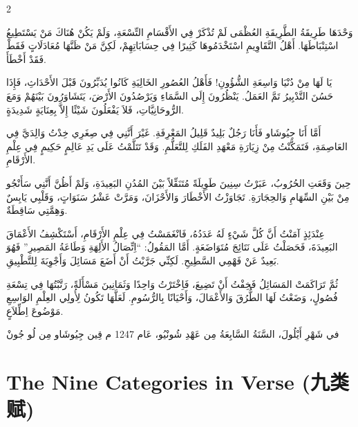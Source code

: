 \documentclass[11pt,a4paper]{article}
\newcommand{\ar}[1]{\arabicfont\beginR #1\endR}
\providecommand{\enquote}[1]{``#1''}
\newcommand{\zhtext}[1]{{\chinese #1}}
\newenvironment{bilingual}{%
  \begin{paracol}{2}
}{%
  \end{paracol}
}
\begin{document}
\begin{bilingual}
\begin{rightcolumn*}
\ar{وَحْدَهَا طَرِيقَةُ الطَّرِيقَةِ العُظْمَى لَمْ تُذْكَرْ فِي الأَقْسَامِ التِّسْعَةِ، وَلَمْ يَكُنْ هُنَاكَ مَنْ يَسْتَطِيعُ اسْتِنْبَاطَهَا. أَهْلُ التَّقَاوِيمِ اسْتَخْدَمُوهَا كَثِيرًا فِي حِسَابَاتِهِمْ، لَكِنَّ مَنْ ظَنَّهَا مُعَادَلَاتٍ فَقَطْ فَقَدْ أَخْطَأَ.}

\ar{يَا لَهَا مِنْ دُنْيَا وَاسِعَةِ الشُّؤُونِ! فَأَهْلُ العُصُورِ الخَالِيَةِ كَانُوا يُدَبِّرُونَ قَبْلَ الأَحْدَاثِ، فَإِذَا حَسُنَ التَّدْبِيرُ تَمَّ العَمَلُ. يَنْظُرُونَ إِلَى السَّمَاءِ وَيَرْصُدُونَ الأَرْضَ، يَتَشَاوَرُونَ بَيْنَهُمْ وَمَعَ الرُّوحَانِيَّاتِ، فَلاَ يَفْعَلُونَ شَيْئًا إِلاَّ بِعِنَايَةٍ شَدِيدَةٍ.}

\ar{أَمَّا أَنَا جِيُوشَاو فَأَنَا رَجُلٌ بَلِيدٌ قَلِيلُ المَعْرِفَةِ. غَيْرَ أَنَّنِي فِي صِغَرِي خِدْتُ وَالِدَيَّ فِي العَاصِمَةِ، فَتَمَكَّنْتُ مِنْ زِيَارَةِ مَعْهَدِ الفَلَكِ لِلتَّعَلُّمِ. وَقَدْ تَتَلَّمْتُ عَلَى يَدِ عَالِمٍ حَكِيمٍ فِي عِلْمِ الأَرْقَامِ.}

\ar{حِينَ وَقَعَتِ الحُرُوبُ، عَبَرْتُ سِنِينَ طَوِيلَةً مُتَنَقِّلاً بَيْنَ المُدُنِ البَعِيدَةِ، وَلَمْ أَظُنَّ أَنَّنِي سَأَنْجُو مِنْ بَيْنِ السِّهَامِ وَالحِجَارَةِ. تَجَاوَزْتُ الأَخْطَارَ وَالأَحْزَانَ، وَمَرَّتْ عَشْرُ سَنَوَاتٍ، وَقَلْبِي يَابِسٌ وَهِمَّتِي سَاقِطَةٌ.}

\ar{عِنْدَئِذٍ آمَنْتُ أَنَّ كُلَّ شَيْءٍ لَهُ عَدَدُهُ، فَانْغَمَسْتُ فِي عِلْمِ الأَرْقَامِ، أَسْتَكْشِفُ الأَعْمَاقَ البَعِيدَةَ، فَحَصَلْتُ عَلَى نَتَائِجَ مُتَوَاضَعَةٍ. أَمَّا المَقُولُ: \enquote{اِتِّصَالُ الأَلِهَةِ وَطَاعَةُ المَصِيرِ} فَهُوَ بَعِيدٌ عَنْ فَهْمِي السَّطِيحِ. لَكِنِّي جَرَّبْتُ أَنْ أَضَعَ مَسَائِلَ وَأَجْوِبَةَ لِلتَّطْبِيقِ.}

\ar{ثُمَّ تَرَاكَمَتْ المَسَائِلُ فَخِفْتُ أَنْ تَضِيعَ، فَاِخْتَرْتُ وَاحِدًا وَثَمَانِينَ مَسْأَلَةً، رَتَّبْتُهَا فِي تِسْعَةِ فُصُولٍ، وَضَعْتُ لَهَا الطُّرُقَ وَالأَعْمَالَ، وَأَحْيَانًا بِالرُّسُومِ. لَعَلَّهَا تَكُونُ لِأُولِي العِلْمِ الوَاسِعِ مَوْضُوعَ اِطِّلاَعٍ.}

\vfill
\ar{\hfill في شَهْرِ أَيْلُولَ، السَّنَةُ السَّابِعَةُ مِن عَهْدِ شُونْيُو، عَام 1247 م}
\ar{\hfill قِين جِيُوشَاو مِن لُو جُونْ}
\end{rightcolumn*}

\end{bilingual}

\newpage

\section{The Nine Categories in Verse (\zhtext{九类赋})}
\end{document}
